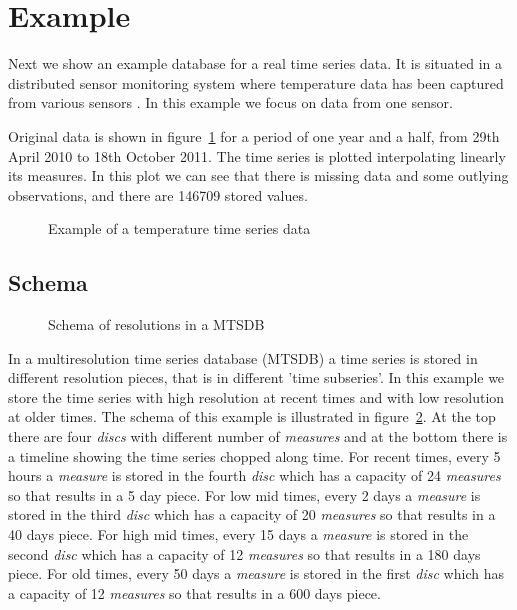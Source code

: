 \section{Example}
\label{sec:example}

Next we show an example database for a real time series data.  It is
situated in a distributed sensor monitoring system where temperature
data has been captured from various sensors \cite{alippi10}. In this
example we focus on data from one sensor. 

Original data is shown in figure~\ref{fig:exemple:original} for a
period of one year and a half, from 29th April 2010 to 18th October
2011.  The time series is plotted interpolating linearly its measures.
In this plot we can see that there is missing data and some outlying
observations, and there are 146709 stored values.


\begin{figure}[tp]
  \centering
  
  \caption{Example of a temperature time series data}
  \label{fig:exemple:original}
\end{figure}



\subsection{Schema}

\begin{figure}[tp]
\centering
\setlength{\unitlength}{1.3mm}

\caption{Schema of resolutions in a MTSDB}
\label{fig:exemple:window}
\end{figure}


In a multiresolution time series database (MTSDB) a time series is
stored in different resolution pieces, that is in different 'time
subseries'.  In this example we store the time series with high
resolution at recent times and with low resolution at older times. The
schema of this example is illustrated in
figure~\ref{fig:exemple:window}. At the top there are four
\emph{discs} with different number of \emph{measures} and at the
bottom there is a timeline showing the time series chopped along
time. For recent times, every 5 hours a \emph{measure} is stored in
the fourth \emph{disc} which has a capacity of 24 \emph{measures} so
that results in a 5 day piece. For low mid times, every 2 days a
\emph{measure} is stored in the third \emph{disc} which has a capacity
of 20 \emph{measures} so that results in a 40 days piece. For high mid
times, every 15 days a \emph{measure} is stored in the second
\emph{disc} which has a capacity of 12 \emph{measures} so that results
in a 180 days piece. For old times, every 50 days a \emph{measure} is
stored in the first \emph{disc} which has a capacity of 12
\emph{measures} so that results in a 600 days piece.



